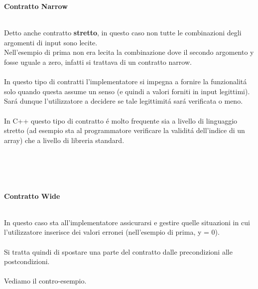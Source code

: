 \documentclass{article}
\begin{document}
\\ \\ \\ \\ \\
\begin{large}\textbf{\textcolor{blu}{Contratto Narrow}} \\ \\ \end{large}
Detto anche contratto \textbf{stretto}, in questo caso non tutte le combinazioni degli argomenti di input sono lecite.\\ Nell'esempio di prima non era lecita la combinazione dove il secondo argomento y fosse uguale a zero, infatti si trattava di un contratto narrow. \\ \\In questo tipo di contratti l'implementatore si impegna a fornire la funzionalit\'a solo quando questa assume un senso (e quindi a valori forniti in input legittimi). \\Sar\'a dunque l'utilizzatore a decidere se tale legittimit\'a sar\'a verificata o meno.\\ \\In C++ questo tipo di contratto \'e molto frequente sia a livello di linguaggio stretto (ad esempio sta al programmatore verificare la validit\'a dell'indice di un array) che a livello di libreria standard.
\\ \\ \\ \\ \\
\begin{large}\textbf{\textcolor{blu}{Contratto Wide}} \\ \\ \end{large}
In questo caso sta all'implementatore assicurarsi e gestire quelle situazioni in cui l'utilizzatore inserisce dei valori erronei (nell'esempio di prima, y = 0).\\ \\Si tratta quindi di spostare una parte del contratto dalle precondizioni alle postcondizioni. \\ \\Vediamo il contro-esempio. \\ \\
\end{document}
